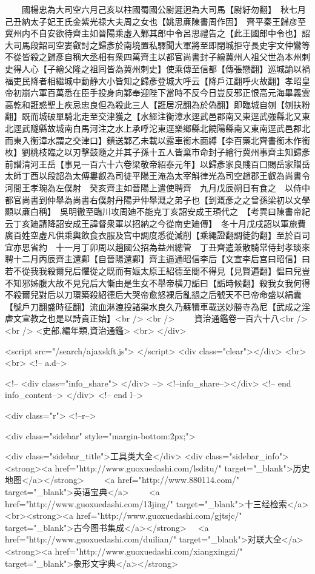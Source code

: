 　　國楊忠為大司空六月己亥以柱國蜀國公尉遲迥為大司馬【尉紆勿翻】　秋七月己丑納太子妃王氏金紫光禄大夫周之女也【姚思亷陳書周作固】　齊平秦王歸彦至冀州内不自安欲待齊主如晉陽乘虛入鄴其郎中令呂思禮告之【此王國郎中令也】詔大司馬段韶司空婁叡討之歸彥於南境置私驛聞大軍將至即閉城拒守長史宇文仲鸞等不從皆殺之歸彥自稱大丞相有衆四萬齊主以都官尚書封子繪冀州人祖父世為本州刺史得人心【子繪父隆之祖囘皆為冀州刺史】使乘傳至信都【傳張戀翻】巡城諭以禍福吏民降者相繼城中動静大小皆知之歸彥登城大呼云【降戶江翻呼火故翻】孝昭皇帝初崩六軍百萬悉在臣手投身向鄴奉迎陛下當時不反今日豈反邪正恨高元海畢義雲高乾和誑惑聖上疾忌忠良但為殺此三人【誑居况翻為於偽翻】即臨城自刎【刎扶粉翻】既而城破單騎北走至交津獲之【水經注衡漳水逕武邑郡南又東逕武強縣北又東北逕武隧縣故城南白馬河注之水上承呼沱東逕樂鄉縣北饒陽縣南又東南逕武邑郡北而東入衡漳水謂之交津口】鎻送鄴乙未載以露車銜木面縛【李百藥北齊書銜木作銜枚】劉桃枝臨之以刃擊鼓隨之并其子孫十五人皆棄市命封子繪行冀州事齊主知歸彥前譖清河王岳【事見一百六十六卷梁敬帝紹泰元年】以歸彥家良賤百口賜岳家贈岳太師丁酉以段韶為太傅婁叡為司徒平陽王淹為太宰斛律光為司空趙郡王叡為尚書令河間王孝琬為左僕射　癸亥齊主如晉陽上遣使聘齊　九月戊辰朔日有食之　以侍中都官尚書到仲舉為尚書右僕射丹陽尹仲舉溉之弟子也【到溉彥之之曾孫梁初以文學顯以亷白稱】　吳明徹至臨川攻周廸不能克丁亥詔安成王頊代之　【考異曰陳書帝紀云丁亥廸請降詔安成王諱督衆軍以招納之今從南史廸傳】　冬十月戊戌詔以軍旅費廣百姓空虛凡供乘輿飲食衣服及宫中調度悉從減削【乘繩證翻調徒釣翻】至於百司宜亦思省約　十一月丁卯周以趙國公招為益州總管　丁丑齊遣兼散騎常侍封孝琰來聘十二月丙辰齊主還鄴【自晉陽還鄴】齊主逼通昭信李后【文宣李后宫曰昭信】曰若不從我我殺爾兒后懼從之既而有娠太原王紹德至閤不得見【見賢遍翻】愠曰兒豈不知邪姊腹大故不見兒后大慚由是生女不舉帝横刀詬曰【詬時候翻】殺我女我何得不殺爾兒對后以刀環築殺紹德后大哭帝愈怒裸后亂撾之后號天不已帝命盛以絹囊【號戶刀翻盛時征翻】流血淋漉投諸渠水良久乃蘇犢車載送妙勝寺為尼【武成之淫虐文宣教之也是以詩貴正始】<br />
<br />
　　資治通鑑卷一百六十八<br />
<br />
<史部,編年類,資治通鑑>  <br>
   </div> 

<script src="/search/ajaxskft.js"> </script>
 <div class="clear"></div>
<br>
<br>
 <!-- a.d-->

 <!--
<div class="info_share">
</div> 
-->
 <!--info_share--></div>   <!-- end info_content-->
  </div> <!-- end l-->

<div class="r">   <!--r-->



<div class="sidebar"  style="margin-bottom:2px;">

 
<div class="sidebar_title">工具类大全</div>
<div class="sidebar_info">
<strong><a href="http://www.guoxuedashi.com/lsditu/" target="_blank">历史地图</a></strong>　　
<a href="http://www.880114.com/" target="_blank">英语宝典</a>　　
<a href="http://www.guoxuedashi.com/13jing/" target="_blank">十三经检索</a>　
<br><strong><a href="http://www.guoxuedashi.com/gjtsjc/" target="_blank">古今图书集成</a></strong>　
<a href="http://www.guoxuedashi.com/duilian/" target="_blank">对联大全</a>　<strong><a href="http://www.guoxuedashi.com/xiangxingzi/" target="_blank">象形文字典</a></strong>　

